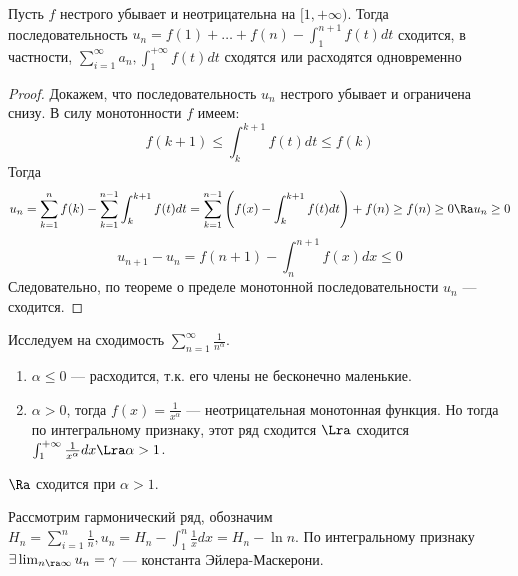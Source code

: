 
\begin{theorem}
    Пусть \(f\) нестрого убывает и неотрицательна на \([1, +\infty)\). Тогда последовательность \(u_n = f(1) + \dots + f(n) - \int_{1}^{n+1}f(t)dt\) сходится, в частности, \(\sum_{i = 1}^\infty a_n, \int_{1}^{+\infty}f(t)dt\) сходятся или расходятся одновременно
\end{theorem}
\begin{proof}
    Докажем, что последовательность \(u_n\) нестрого убывает и ограничена снизу. В силу монотонности \(f\) имеем:
    \[f(k+1) \le \int_k^{k+1}f(t)dt \le f(k)\]
    Тогда 
    \[u_n = \sum_{k = 1}^n f(k) - \sum_{k = 1}^{n-1}\int_k^{k+1}f(t)dt = \sum_{k = 1}^{n - 1}\left(f(x) - \int_k^{k + 1}f(t)dt\right) + f(n) \ge f(n) \ge 0 \Ra u_n \ge 0\]
    \[u_{n+1} - u_n = f(n+1) - \int_n^{n + 1}f(x)dx \le 0\]
    Следовательно, по теореме о пределе монотонной последовательности \(u_n\) --- сходится.
\end{proof}

\begin{example}
    Исследуем на сходимость \(\sum_{n = 1}^{\infty} \frac{1}{n^\alpha}\).
    \begin{enumerate}
        \item \(\alpha \le 0\) --- расходится, т.к. его члены не бесконечно маленькие.
        \item \(\alpha > 0\), тогда \(f(x) = \frac{1}{x^\alpha}\) --- неотрицательная монотонная функция. Но тогда по интегральному признаку, этот ряд сходится \(\Lra\) сходится \(\int_1^{+\infty} \frac{1}{x^\alpha}dx \Lra \alpha > 1\).
    \end{enumerate}
    \(\Ra\) сходится при \(\alpha > 1\).
\end{example}

\begin{example}
    Рассмотрим гармонический ряд, обозначим \(H_n = \sum_{i = 1}^n \frac{1}{n}, u_n = H_n - \int_1^n \frac{1}{x}dx = H_n - \ln n\). По интегральному признаку \(\exists \lim_{n\ra \infty}u_n = \gamma\)  --- константа Эйлера-Маскерони.
\end{example}

